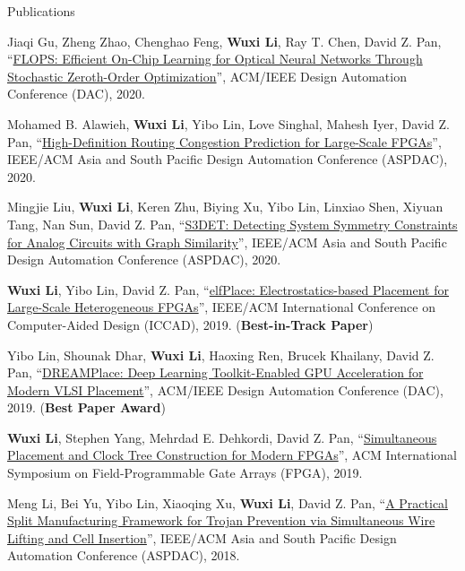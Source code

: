 \begin{rSection}{Publications}
\begin{description}[font=\normalfont]
\item[{[C11]}]{
    Jiaqi Gu, Zheng Zhao, Chenghao Feng, \textbf{Wuxi Li}, Ray T. Chen, David Z. Pan,
    ``\href{https://ieeexplore.ieee.org/document/9218593}{FLOPS: Efficient On-Chip Learning for Optical Neural Networks Through Stochastic Zeroth-Order Optimization}'',
    ACM/IEEE Design Automation Conference (DAC), 2020.
}

\item[{[C10]}]{
    Mohamed B. Alawieh, \textbf{Wuxi Li}, Yibo Lin, Love Singhal, Mahesh Iyer, David Z. Pan,
    ``\href{https://ieeexplore.ieee.org/document/9045178}{High-Definition Routing Congestion Prediction for Large-Scale FPGAs}'',
    IEEE/ACM Asia and South Pacific Design Automation Conference (ASPDAC), 2020.
}

\item[{[C9]}]{
    Mingjie Liu, \textbf{Wuxi Li}, Keren Zhu, Biying Xu, Yibo Lin, Linxiao Shen, Xiyuan Tang, Nan Sun, David Z. Pan,
    ``\href{https://ieeexplore.ieee.org/document/9045109}{S3DET: Detecting System Symmetry Constraints for Analog Circuits with Graph Similarity}'',
    IEEE/ACM Asia and South Pacific Design Automation Conference (ASPDAC), 2020.
}

\item[{[C8]}]{
    \textbf{Wuxi Li}, Yibo Lin, David Z. Pan,
    ``\href{https://ieeexplore.ieee.org/document/8942075}{elfPlace: Electrostatics-based Placement for Large-Scale Heterogeneous FPGAs}'',
    IEEE/ACM International Conference on Computer-Aided Design (ICCAD), 2019.
    (\textbf{Best-in-Track Paper})
}

\item[{[C7]}]{
    Yibo Lin, Shounak Dhar, \textbf{Wuxi Li}, Haoxing Ren, Brucek Khailany, David Z. Pan,
    ``\href{https://dl.acm.org/citation.cfm?id=3317803}{DREAMPlace: Deep Learning Toolkit-Enabled GPU Acceleration for Modern VLSI Placement}'',
    ACM/IEEE Design Automation Conference (DAC), 2019.
    (\textbf{Best Paper Award})
}

\item[{[C6]}]{
    \textbf{Wuxi Li}, Stephen Yang, Mehrdad E. Dehkordi, David Z. Pan,
    ``\href{https://dl.acm.org/citation.cfm?id=3293897}{Simultaneous Placement and Clock Tree Construction for Modern FPGAs}'',
    ACM International Symposium on Field-Programmable Gate Arrays (FPGA), 2019.
}

\item[{[C5]}]{
    Meng Li, Bei Yu, Yibo Lin, Xiaoqing Xu, \textbf{Wuxi Li}, David Z. Pan,
    ``\href{https://ieeexplore.ieee.org/document/8297316}{A Practical Split Manufacturing Framework for Trojan Prevention via Simultaneous Wire Lifting and Cell Insertion}'',
    IEEE/ACM Asia and South Pacific Design Automation Conference (ASPDAC), 2018.
}


\end{description}
\end{rSection}
